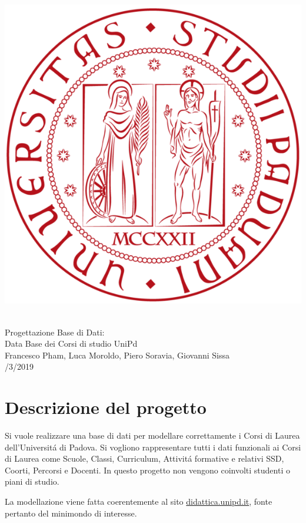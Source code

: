 \documentclass[a4paper,12pt,italian,towside]{article}
\begin{document}
\begin{titlepage}
	\centering
	\includegraphics[scale= 0.2]{unipd.png} \centering 
	{\huge \\ \medskip Progettazione Base di Dati: \\ Data Base dei Corsi di studio UniPd\\ \medskip \medskip  \medskip \normalsize Francesco Pham, Luca Moroldo, Piero Soravia, Giovanni Sissa \\ /3/2019\par }
	

\end{titlepage}



\newpage

\tableofcontents

\newpage
\section{Descrizione del progetto}
Si vuole realizzare una base di dati per modellare correttamente i Corsi di Laurea dell'Universit\'a di Padova.
Si vogliono rappresentare tutti i dati funzionali ai Corsi di Laurea come Scuole, Classi, Curriculum, Attivit\'a formative e relativi SSD, Coorti, Percorsi e Docenti.
In questo progetto non vengono coinvolti studenti o piani di studio.
\par
La modellazione viene fatta coerentemente al sito  \href{https://didattica.unipd.it/}{didattica.unipd.it}, fonte pertanto del minimondo di interesse.
\end{document}
